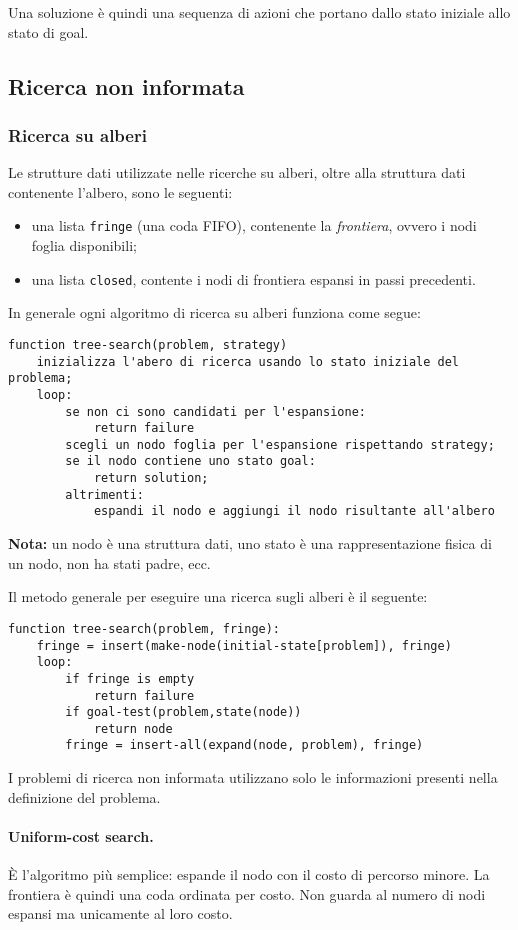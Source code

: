 \documentclass[a4paper, 11pt]{article}
\begin{document}
Una soluzione è quindi una sequenza di azioni che portano dallo stato iniziale allo stato di goal.




\subsection{Ricerca non informata}
\subsubsection{Ricerca su alberi}
Le strutture dati utilizzate nelle ricerche su alberi, oltre alla struttura dati contenente l'albero, sono le seguenti:
\begin{itemize}
	\item una lista \lstinline|fringe| (una coda FIFO), contenente la \textit{frontiera}, ovvero i nodi foglia disponibili;
	\item una lista \lstinline|closed|, contente i nodi di frontiera espansi in passi precedenti.
\end{itemize}
In generale ogni algoritmo di ricerca su alberi funziona come segue:
\begin{lstlisting}
function tree-search(problem, strategy)
	inizializza l'abero di ricerca usando lo stato iniziale del problema;
	loop:
		se non ci sono candidati per l'espansione:
			return failure
		scegli un nodo foglia per l'espansione rispettando strategy;
		se il nodo contiene uno stato goal:
			return solution;
		altrimenti:
			espandi il nodo e aggiungi il nodo risultante all'albero
\end{lstlisting}

\noindent
\textbf{Nota:} un nodo è una struttura dati, uno stato è una rappresentazione fisica di un nodo, non ha stati padre, ecc.

Il metodo generale per eseguire una ricerca sugli alberi è il seguente:
\begin{lstlisting}
function tree-search(problem, fringe):
	fringe = insert(make-node(initial-state[problem]), fringe) 
	loop:
		if fringe is empty
			return failure
		if goal-test(problem,state(node))
			return node
		fringe = insert-all(expand(node, problem), fringe)
\end{lstlisting}

I problemi di ricerca non informata utilizzano solo le informazioni presenti nella definizione del problema. 
\paragraph{Uniform-cost search.} È l'algoritmo più semplice: espande il nodo con il costo di percorso minore. La frontiera è quindi una coda ordinata per costo. Non guarda al numero di nodi espansi ma unicamente al loro costo.
\end{document}
